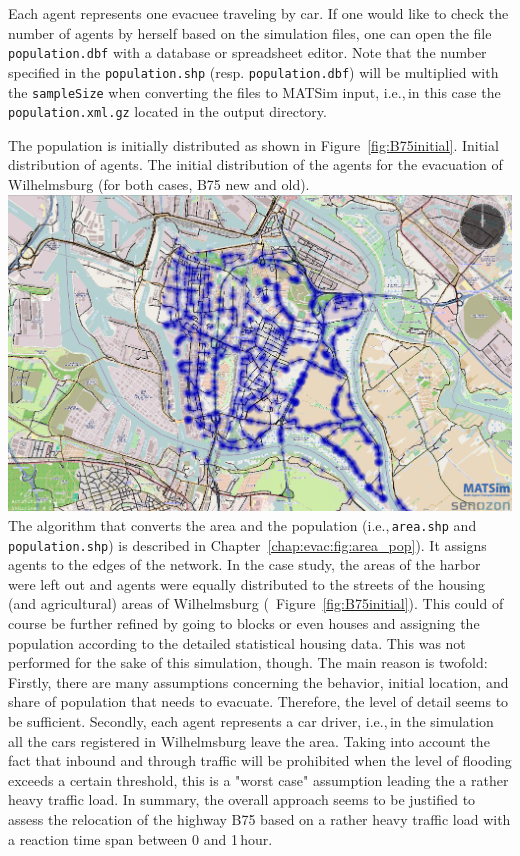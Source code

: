 Each agent represents one evacuee traveling by car. If one would like to check the number of agents by herself based on the simulation files, one can open the file \lstinline|population.dbf| with a database or spreadsheet editor. Note that the number specified in the \lstinline|population.shp| (resp. \lstinline|population.dbf|) will be multiplied with the \lstinline|sampleSize| when converting the files to MATSim input, i.e.,\,in this case the \lstinline|population.xml.gz| located in the output directory.

The population is initially distributed as shown in Figure~\ref{fig:B75initial}. 
%
\createfigure%
{Initial distribution of agents.}%
{The initial distribution of the agents for the evacuation of Wilhelmsburg (for both cases, B75 new and old).}%
{\label{fig:B75initial}}%
{\includegraphics[width=0.7\linewidth]{using/figures/B75initial}}%
{}
The algorithm that converts the area and the population (i.e.,\,\lstinline|area.shp| and \lstinline|population.shp|) is described in Chapter~\ref{chap:evac:fig:area_pop}). It assigns agents to the edges of the network. In the case study, the areas of the harbor were left out and agents were equally distributed to the streets of the housing (and agricultural) areas of Wilhelmsburg (\ Figure~\ref{fig:B75initial}).
This could of course be further refined by going to blocks or even houses and assigning the population according to the detailed statistical housing data. This was not performed for the sake of this simulation, though. The main reason is twofold: Firstly, there are many assumptions concerning the behavior, initial location, and share of population that needs to evacuate. Therefore, the level of detail seems to be sufficient. Secondly, each agent represents a car driver, i.e.,\,in the simulation all the cars registered in Wilhelmsburg leave the area. Taking into account the fact that inbound and through traffic will be prohibited when the level of flooding exceeds a certain threshold, this is a "worst case" assumption leading the a rather heavy traffic load. In summary, the overall approach seems to be justified to assess the relocation of the highway B75 based on a rather heavy traffic load with a reaction time span between 0 and 1\,hour.


